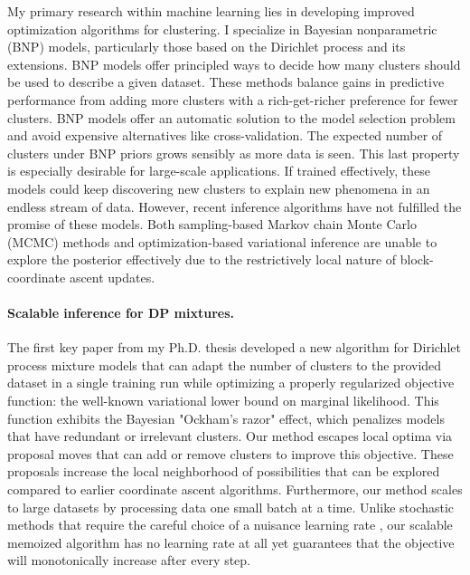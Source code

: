 \documentclass[11pt,letterpaper,sans]{article}
\begin{document}
My primary research within machine learning lies in developing improved optimization algorithms for clustering. I specialize in Bayesian nonparametric (BNP) models, particularly those based on the Dirichlet process and its extensions. BNP models offer principled ways to decide how many clusters should be used to describe a given dataset. These methods balance gains in predictive performance from adding more clusters with a rich-get-richer preference for fewer clusters. BNP models offer an automatic solution to the model selection problem and avoid expensive alternatives like cross-validation. 
The expected number of clusters under BNP priors grows sensibly as more data is seen. This last property is especially desirable for large-scale applications. If trained effectively, these models could keep discovering new clusters to explain new phenomena in an endless stream of data.
However, recent inference algorithms have not fulfilled the promise of these models. Both sampling-based Markov chain Monte Carlo (MCMC) methods and optimization-based variational inference are unable to explore the posterior effectively due to the restrictively local nature of block-coordinate ascent updates.

\paragraph{Scalable inference for DP mixtures.}
The first key paper from my Ph.D. thesis \cite{hughes:moVB} developed a new algorithm for Dirichlet process mixture models that can adapt the number of clusters to the provided dataset in a single training run while optimizing a properly regularized objective function: the well-known variational lower bound on marginal likelihood. This function exhibits the Bayesian "Ockham's razor" effect, which penalizes models that have redundant or irrelevant clusters. Our method escapes local optima via proposal moves that can add or remove clusters to improve this objective. These proposals increase the local neighborhood of possibilities that can be explored compared to earlier coordinate ascent algorithms. Furthermore, our method scales to large datasets by processing data one small batch at a time. Unlike stochastic methods that require the careful choice of a nuisance learning rate \cite{hoffman:svi}, our scalable memoized algorithm has no learning rate at all yet guarantees that the objective will monotonically increase after every step.
\end{document}
